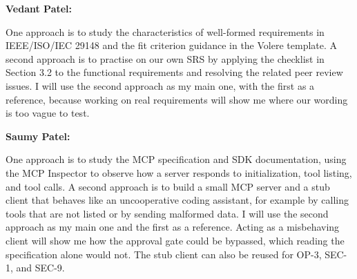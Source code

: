 \documentclass[12pt, titlepage]{article}
\begin{document}
\begin{enumerate}
  \textbf{Vedant Patel:}

  One approach is to study the characteristics of well-formed requirements in
  IEEE/ISO/IEC 29148 and the fit criterion guidance in the Volere template. A
  second approach is to practise on our own SRS by applying the checklist in
  Section 3.2 to the functional requirements and resolving the related peer
  review issues. I will use the second approach as my main one, with the first
  as a reference, because working on real requirements will show me where our
  wording is too vague to test.

  \textbf{Saumy Patel:}

  One approach is to study the MCP specification and SDK documentation, using the
  MCP Inspector to observe how a server responds to initialization, tool listing,
  and tool calls. A second approach is to build a small MCP server and a stub client
  that behaves like an uncooperative coding assistant, for example by calling tools
  that are not listed or by sending malformed data. I will use the second approach
  as my main one and the first as a reference. Acting as a misbehaving client will
  show me how the approval gate could be bypassed, which reading the specification
  alone would not. The stub client can also be reused for OP-3, SEC-1, and SEC-9.
  
\end{enumerate}
\end{document}
